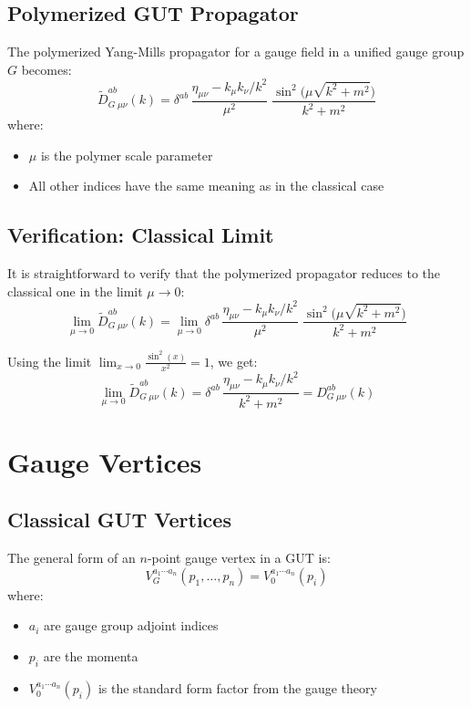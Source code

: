 \documentclass[11pt]{article}
\begin{document}
\subsection{Polymerized GUT Propagator}
The polymerized Yang-Mills propagator for a gauge field in a unified gauge group $G$ becomes:
\begin{equation}
    \boxed{
    \widetilde{D}_G^{ab}{}_{\mu\nu}(k) = \delta^{ab}\,\frac{\eta_{\mu\nu}-k_\mu k_\nu/k^2}{\mu^2} \;\frac{\sin^2\!\bigl(\mu\sqrt{k^2 + m^2}\bigr)}{k^2 + m^2}
    }
\end{equation}
where:
\begin{itemize}
    \item $\mu$ is the polymer scale parameter
    \item All other indices have the same meaning as in the classical case
\end{itemize}

\subsection{Verification: Classical Limit}
It is straightforward to verify that the polymerized propagator reduces to the classical one in the limit $\mu \to 0$:
\begin{equation}
    \lim_{\mu \to 0} \widetilde{D}_G^{ab}{}_{\mu\nu}(k) = \lim_{\mu \to 0} \delta^{ab}\,\frac{\eta_{\mu\nu}-k_\mu k_\nu/k^2}{\mu^2} \;\frac{\sin^2\!\bigl(\mu\sqrt{k^2 + m^2}\bigr)}{k^2 + m^2}
\end{equation}

Using the limit $\lim_{x \to 0} \frac{\sin^2(x)}{x^2} = 1$, we get:
\begin{equation}
    \lim_{\mu \to 0} \widetilde{D}_G^{ab}{}_{\mu\nu}(k) = \delta^{ab}\,\frac{\eta_{\mu\nu}-k_\mu k_\nu/k^2}{k^2 + m^2} = D_G^{ab}{}_{\mu\nu}(k)
\end{equation}

\section{Gauge Vertices}

\subsection{Classical GUT Vertices}
The general form of an $n$-point gauge vertex in a GUT is:
\begin{equation}
    V_G^{a_1\cdots a_n}(p_1,\ldots,p_n) = V_{0}^{a_1\cdots a_n}(p_i)
\end{equation}
where:
\begin{itemize}
    \item $a_i$ are gauge group adjoint indices
    \item $p_i$ are the momenta
    \item $V_{0}^{a_1\cdots a_n}(p_i)$ is the standard form factor from the gauge theory
\end{itemize}
\end{document}

